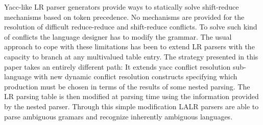 %
Yacc-like LR parser generators provide ways to statically solve
shift-reduce mechanisms based on token precedence. No
mechanisms are provided for the resolution of difficult reduce-reduce
and shift-reduce conflicts. To solve such kind of conflicts the language
designer has to modify the grammar.  The usual approach
to cope with these limitations has been to extend
LR parsers with the capacity to branch at any multivalued
table entry. 
The strategy presented in this paper takes an entirely different path:
It extends
yacc conflict resolution sub-language with new dynamic
conflict resolution constructs specifying which production 
must be chosen in terms of the results of some nested parsing.
The LR parsing table is then modified at parsing time using the
information provided by the nested parser.
Through this simple modification LALR parsers
are able to parse ambiguous gramars and recognize inherently ambiguous
languages. 




